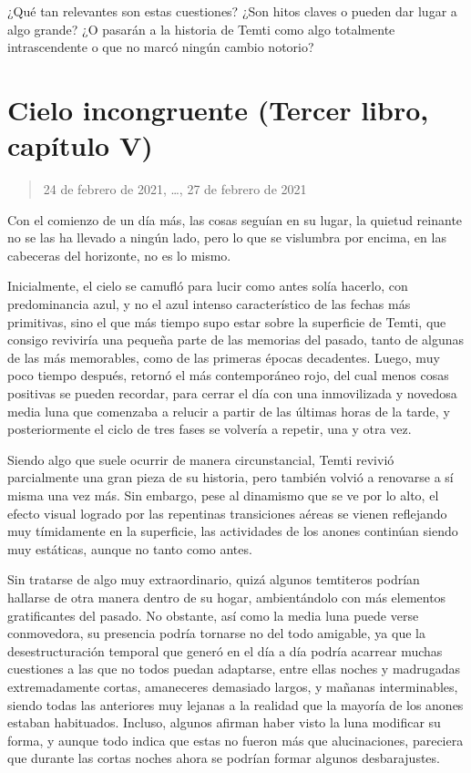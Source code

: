 \documentclass[
]{book}
\begin{document}
¿Qué tan relevantes son estas cuestiones? ¿Son hitos claves o pueden dar lugar a algo grande? ¿O pasarán a la historia de Temti como algo totalmente intrascendente o que no marcó ningún cambio notorio?

\hypertarget{cielo-incongruente-tercer-libro-capuxedtulo-v}{%
\section{Cielo incongruente (Tercer libro, capítulo V)}\label{cielo-incongruente-tercer-libro-capuxedtulo-v}}

\begin{quote}
24 de febrero de 2021, \ldots, 27 de febrero de 2021
\end{quote}

Con el comienzo de un día más, las cosas seguían en su lugar, la quietud reinante no se las ha llevado a ningún lado, pero lo que se vislumbra por encima, en las cabeceras del horizonte, no es lo mismo.

Inicialmente, el cielo se camufló para lucir como antes solía hacerlo, con predominancia azul, y no el azul intenso característico de las fechas más primitivas, sino el que más tiempo supo estar sobre la superficie de Temti, que consigo reviviría una pequeña parte de las memorias del pasado, tanto de algunas de las más memorables, como de las primeras épocas decadentes. Luego, muy poco tiempo después, retornó el más contemporáneo rojo, del cual menos cosas positivas se pueden recordar, para cerrar el día con una inmovilizada y novedosa media luna que comenzaba a relucir a partir de las últimas horas de la tarde, y posteriormente el ciclo de tres fases se volvería a repetir, una y otra vez.

Siendo algo que suele ocurrir de manera circunstancial, Temti revivió parcialmente una gran pieza de su historia, pero también volvió a renovarse a sí misma una vez más. Sin embargo, pese al dinamismo que se ve por lo alto, el efecto visual logrado por las repentinas transiciones aéreas se vienen reflejando muy tímidamente en la superficie, las actividades de los anones continúan siendo muy estáticas, aunque no tanto como antes.

Sin tratarse de algo muy extraordinario, quizá algunos temtiteros podrían hallarse de otra manera dentro de su hogar, ambientándolo con más elementos gratificantes del pasado. No obstante, así como la media luna puede verse conmovedora, su presencia podría tornarse no del todo amigable, ya que la desestructuración temporal que generó en el día a día podría acarrear muchas cuestiones a las que no todos puedan adaptarse, entre ellas noches y madrugadas extremadamente cortas, amaneceres demasiado largos, y mañanas interminables, siendo todas las anteriores muy lejanas a la realidad que la mayoría de los anones estaban habituados. Incluso, algunos afirman haber visto la luna modificar su forma, y aunque todo indica que estas no fueron más que alucinaciones, pareciera que durante las cortas noches ahora se podrían formar algunos desbarajustes.
\end{document}
